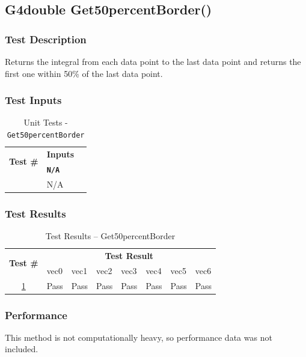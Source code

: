 \documentclass[12pt]{article}
\newcounter{TestCounter}
\begin{document}
\subsection{G4double Get50percentBorder()}%
	\subsubsection{Test Description}
	 Returns the integral from each data point to the last data point and returns the first one within 
50\% of the last data point.
	
	\subsubsection{Test Inputs}
		\begin{table}[H]
		\centering
		\caption{Unit Tests - \texttt{Get50percentBorder}}\label{Get50percentBorder_unit}
		\begin{tabular}{lll}
		\toprule
		\multirow{2}{*}{\bf Test \#}  & \multicolumn{1}{c}{\bf Inputs}\\
		& \bf \texttt{N/A}\\\midrule
		{TestCounter}\arabic{TestCounter}\label{Get50percentBorder_0} & N/A \\
		\bottomrule
		\end{tabular}
		\end{table}
	
	\subsubsection{Test Results}
		\begin{table}[H]
		\centering
		\caption{Test Results -- Get50percentBorder}\label{Get50percentBorder_acc}
		\begin{tabular}{clllllll}
		\toprule
		\multirow{2}{*}{\bf Test \#} & \multicolumn{7}{c}{\bf Test Result}\\
		& vec0 & vec1 & vec2 & vec3 & vec4 & vec5 & vec6\\\midrule
		\ref{Get50percentBorder_0} & Pass & Pass & Pass & Pass & Pass & Pass & Pass\\
		\bottomrule
		\end{tabular}
		\end{table}

	\subsubsection{Performance}
		This method is not computationally heavy, so performance data was not included.
		
\end{document}

